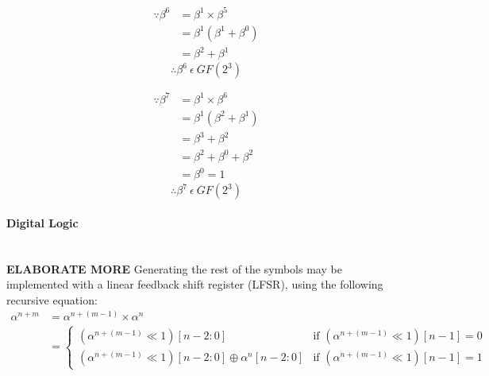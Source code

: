         \begin{minipage}[t]{0.5\textwidth}
            \begin{equation*}
                \begin{split}
                    \because \beta^{6} & = \beta^{1} \times \beta^{5} \\
                    & = \beta^{1} (\beta^{1}+\beta^{0}) \\
                    & = \beta^{2}+\beta^{1}
                \end{split}
            \end{equation*}
            \[ \therefore \beta^{6} \ \epsilon \ GF(2^{3}) \]
        \end{minipage}
        \begin{minipage}[t]{0.5\textwidth}
            \begin{equation*}
                \begin{split}
                    \because \beta^{7} & = \beta^{1} \times \beta^{6} \\
                    & = \beta^{1} (\beta^{2}+\beta^{1}) \\
                    & = \beta^{3}+\beta^{2} \\
                    & = \beta^{2}+\beta^{0}+\beta^{2} \\
                    & = \beta^{0} = 1
                \end{split}
            \end{equation*}
            \[ \therefore \beta^{7} \ \epsilon \ GF(2^{3}) \]
        \end{minipage}
        \newpage

        \paragraph{Digital Logic} \leavevmode \\ \textbf{ELABORATE MORE}
        Generating the rest of the symbols may be implemented with a linear
        feedback shift register (LFSR), using the following recursive equation:
        \begin{equation*}
            \begin{split}
                \alpha^{n+m} & =\alpha^{n+(m-1)}\times \alpha^{n} \\
                & = \begin{cases}
                        (\alpha^{n+(m-1)} \ll 1 )[n-2:0] & \text{if
                        $(\alpha^{n+(m-1)} \ll 1 )[n-1] = 0$} \\
                        (\alpha^{n+(m-1)} \ll 1 )[n-2:0] \oplus
                        \alpha^{n}[n-2:0] & \text{if $(\alpha^{n+(m-1)} \ll 1
                        )[n-1] = 1$}
                    \end{cases}
            \end{split}
        \end{equation*}
